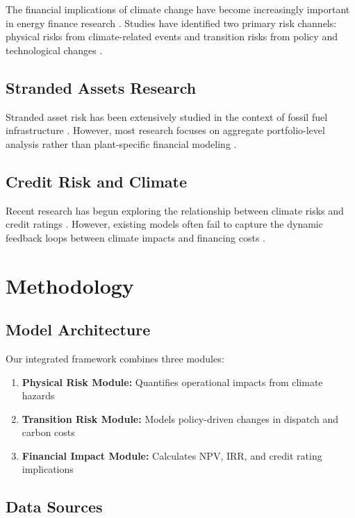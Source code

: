 \documentclass[11pt,a4paper]{article}
\begin{document}
The financial implications of climate change have become increasingly important in energy finance research \citep{caldecott2021stranded}. Studies have identified two primary risk channels: physical risks from climate-related events and transition risks from policy and technological changes \citep{daumas2024financial}.

\subsection{Stranded Assets Research}

Stranded asset risk has been extensively studied in the context of fossil fuel infrastructure \citep{bressan2024asset}. However, most research focuses on aggregate portfolio-level analysis rather than plant-specific financial modeling \citep{hoffart2024energy}.

\subsection{Credit Risk and Climate}

Recent research has begun exploring the relationship between climate risks and credit ratings \citep{jung2021crisk}. However, existing models often fail to capture the dynamic feedback loops between climate impacts and financing costs \citep{albanese2024effects}.

\section{Methodology}

\subsection{Model Architecture}

Our integrated framework combines three modules:
\begin{enumerate}
\item \textbf{Physical Risk Module:} Quantifies operational impacts from climate hazards
\item \textbf{Transition Risk Module:} Models policy-driven changes in dispatch and carbon costs
\item \textbf{Financial Impact Module:} Calculates NPV, IRR, and credit rating implications
\end{enumerate}

\subsection{Data Sources}
\end{document}
